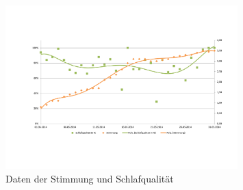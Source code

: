 \begin{figure}[H]
\centering
        \includegraphics[angle=270,width=0.8\textwidth]{images/Analyse/Sleep-Mood} 
        \caption[Daten der Stimmung und Schlafqualität]{Daten der Stimmung und Schlafqualität}
        \label{fig:SchlafqualitätUndStimmung}
\end{figure}


